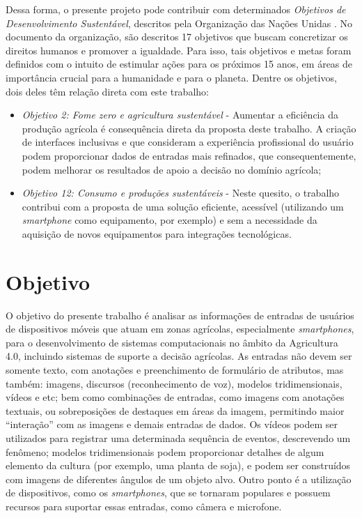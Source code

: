 \documentclass[12pt]{article}
\begin{document}
Dessa forma, o presente projeto pode contribuir com determinados \textit{Objetivos de Desenvolvimento Sustentável}, descritos pela Organização das Nações Unidas \cite{ONU:2020}. No documento da organização, são descritos 17 objetivos que buscam concretizar os direitos humanos e promover a igualdade. Para isso, tais objetivos e metas foram definidos com o intuito de estimular ações para os próximos 15 anos, em áreas de importância crucial para a humanidade e para o planeta. Dentre os objetivos, dois deles têm relação direta com este trabalho:

\begin{itemize}
	\item \textit{Objetivo 2: Fome zero e agricultura sustentável} - Aumentar a eficiência da produção agrícola é consequência direta da proposta deste trabalho. A criação de interfaces inclusivas e que consideram a experiência profissional do usuário podem proporcionar dados de entradas mais refinados, que consequentemente, podem melhorar os resultados de apoio a decisão no domínio agrícola;
	\item \textit{Objetivo 12: Consumo e produções sustentáveis} - Neste quesito, o trabalho contribui com a proposta de uma solução eficiente, acessível (utilizando um \textit{smartphone} como equipamento, por exemplo) e sem a necessidade da aquisição de novos equipamentos para integrações tecnológicas.
\end{itemize}

\section{Objetivo}
\label{sec:objetivo}

O objetivo do presente trabalho é analisar as informações de entradas de usuários de dispositivos móveis que atuam em zonas agrícolas, especialmente \textit{smartphones}, para o desenvolvimento de sistemas computacionais no âmbito da Agricultura 4.0, incluindo sistemas de suporte a decisão agrícolas. As entradas não devem ser somente texto, com anotações e preenchimento de formulário de atributos, mas também: imagens, discursos (reconhecimento de voz), modelos tridimensionais, vídeos e etc; bem como combinações de entradas, como imagens com anotações textuais, ou sobreposições de destaques em áreas da imagem, permitindo maior ``interação'' com as imagens e demais entradas de dados. Os vídeos podem ser utilizados para registrar uma determinada sequência de eventos, descrevendo um fenômeno; modelos tridimensionais podem proporcionar detalhes de algum elemento da cultura (por exemplo, uma planta de soja), e podem ser construídos com imagens de diferentes ângulos de um objeto alvo. Outro ponto é a utilização de dispositivos, como os \textit{smartphones}, que se tornaram populares e possuem recursos para suportar essas entradas, como câmera e microfone.
\end{document}
